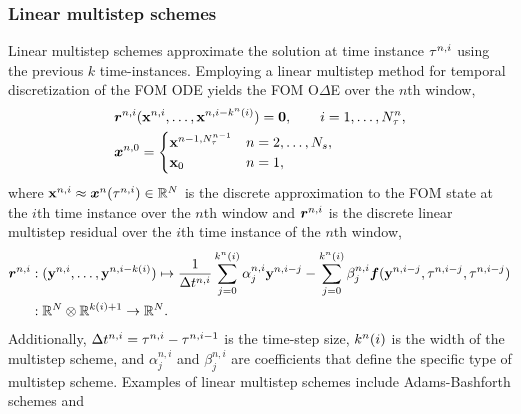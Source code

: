 \subsubsection{Linear multistep schemes}
Linear multistep schemes approximate the solution at time instance $\tau^{n,i}$ using the previous $k$ time-instances.  
Employing a linear multistep method for temporal discretization of the FOM ODE yields the FOM O$\Delta$E over the $n$th window,
\begin{align*}
&\boldsymbol r_{}^{n,i} ({\mathbf{x}}^{n,i},\ldots,{\mathbf{x}}^{n,i-k^n(i)}) = \boldsymbol 0, \qquad i=1,\ldots,N_{\tau}^{n}, \\
&\boldsymbol x^{n,0} = \begin{cases}
{\mathbf{x}}^{n-1,N_{\tau}^{n-1}} & n = 2,\ldots,N_s, \\
{{\mathbf{x}}_0} & n=1, \end{cases}
\end{align*}
where ${\mathbf{x}}^{n,i} \approx {\boldsymbol x}^{n}(\tau^{n,i}) \in \mathbb{R}^{N}$ is the discrete approximation to the FOM state at the $i$th time instance over the $n$th window and $\boldsymbol r_{}^{n,i}$ is the discrete linear multistep residual over the $i$th time instance of the $n$th window,
\begin{align*}
\boldsymbol r^{n,i} &: (\mathbf{y}^{n,i},\ldots,\mathbf{y}^{n,i-k(i)}) \mapsto  \frac{1}{\Delta t^{n,i}} \sum_{j=0}^{k^{n}(i)} \alpha^{n,i}_j \mathbf{y}^{n,i-j} -  \sum_{j=0}^{k^{n}(i)} \beta^{n,i}_j \boldsymbol f(\mathbf{y}^{n,i-j},\tau^{n,i-j},\tau^{n,i-j}) \\
               &: \mathbb{R}^{N} \otimes \mathbb{R}^{k(i)+1} \rightarrow \mathbb{R}^{N}. 
\end{align*} 
Additionally, $\Delta t^{n,i} = \tau^{n,i} - \tau^{n,i-1}$ is the time-step size, $k^{n}(i)$ is the width of the multistep scheme, and $\alpha^{n,i}_j$ and $\beta^{n,i}_j$ are coefficients that 
define the specific type of multistep scheme. Examples of linear multistep schemes include Adams-Bashforth schemes and  
